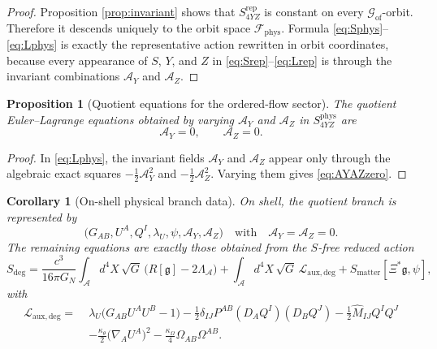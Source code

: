 \documentclass[11pt]{article}
\newcommand{\Sub}{\mathcal{A}}
\newcommand{\BridgeMetric}{\mathfrak{g}}
\newcommand{\AY}{\mathcal A_Y}
\newcommand{\AZ}{\mathcal A_Z}
\newcommand{\FieldSpace}{\mathscr F}
\newcommand{\PhysFieldSpace}{\FieldSpace_{\mathrm{phys}}}
\newcommand{\GaugeGroup}{\mathscr G_{\mathrm{of}}}
\newtheorem{proposition}{Proposition}
\newtheorem{corollary}{Corollary}
\begin{document}
\begin{proof}
Proposition \ref{prop:invariant} shows that \(S_{4YZ}^{\mathrm{rep}}\) is constant on every \(\GaugeGroup\)-orbit. Therefore it descends uniquely to the orbit space \(\PhysFieldSpace\). Formula \eqref{eq:Sphys}--\eqref{eq:Lphys} is exactly the representative action rewritten in orbit coordinates, because every appearance of \(S\), \(Y\), and \(Z\) in \eqref{eq:Srep}--\eqref{eq:Lrep} is through the invariant combinations \(\AY\) and \(\AZ\).
\end{proof}

\begin{proposition}[Quotient equations for the ordered-flow sector]
\label{prop:physAYAZ}
The quotient Euler--Lagrange equations obtained by varying \(\AY\) and \(\AZ\) in \(S_{4YZ}^{\mathrm{phys}}\) are
\begin{equation}
\AY=0,
\qquad
\AZ=0.
\label{eq:AYAZzero}
\end{equation}
\end{proposition}

\begin{proof}
In \eqref{eq:Lphys}, the invariant fields \(\AY\) and \(\AZ\) appear only through the algebraic exact squares \(-\frac12\AY^2\) and \(-\frac12\AZ^2\). Varying them gives \eqref{eq:AYAZzero}.
\end{proof}

\begin{corollary}[On-shell physical branch data]
\label{cor:on-shell}
On shell, the quotient branch is represented by
\begin{equation}
\bigl(G_{AB},U^A,Q^I,\lambda_U,\psi,\AY,\AZ\bigr)
\quad\text{with}\quad
\AY=\AZ=0.
\label{eq:onshelldata}
\end{equation}
The remaining equations are exactly those obtained from the \(S\)-free reduced action
\begin{equation}
S_{\mathrm{deg}}
=
\frac{c^3}{16\pi G_N}
\int_{\Sub} d^4X\,\sqrt{G}\,\bigl(R[\BridgeMetric]-2\Lambda_{\Sub}\bigr)
+\int_{\Sub} d^4X\,\sqrt{G}\,\mathcal L_{\mathrm{aux,deg}}
+S_{\mathrm{matter}}[\Xi^*\BridgeMetric,\psi],
\label{eq:Sdeg}
\end{equation}
with
\begin{align}
\mathcal L_{\mathrm{aux,deg}}
=\;&
\lambda_U\bigl(G_{AB}U^AU^B-1\bigr)
-\frac12\delta_{IJ}P^{AB}(D_AQ^I)(D_BQ^J)
-\frac12\widehat M_{IJ}Q^IQ^J
\nonumber\\
&-\frac{\kappa_\theta}{2}\bigl(\nabla_AU^A\bigr)^2
-\frac{\kappa_\Omega}{4}\Omega_{AB}\Omega^{AB}.
\label{eq:Ldeg}
\end{align}
\end{corollary}
\end{document}

